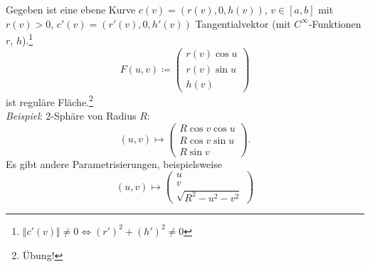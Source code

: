 \begin{example}[Rotationsfläche]
  Gegeben ist eine ebene Kurve $ c(v) = \left( r(v), 0, h(v) \right) $, $ v \in [a,b] $ mit $ r(v) > 0 $, $ c'(v) = \left( r'(v), 0, h'(v) \right) $ Tangentialvektor (mit $ C^\infty $-Funktionen $ r $, $ h $).\footnote{$ \Vert c'(v) \Vert \neq 0 \Leftrightarrow (r')^2 + (h')^2 \neq 0 $}
  \begin{equation*}
    F(u,v) \coloneqq \begin{pmatrix}
      r(v)\cos u \\
      r(v)\sin u \\
      h(v)
    \end{pmatrix}
  \end{equation*}
  ist reguläre Fläche.\footnote{Übung!} \\
  \emph{Beispiel}: $ 2 $-Sphäre von Radius $ R $:
  \begin{equation*}
    (u,v) \mapsto \begin{pmatrix}
      R\cos v \cos u \\
      R\cos v\sin u \\
      R\sin v
    \end{pmatrix}\text{.}
  \end{equation*}
  Es gibt andere Parametrisierungen, beispielsweise
  \begin{equation*}
    (u,v) \mapsto \begin{pmatrix}
      u \\ v \\ \sqrt{R^2-u^2-v^2}
    \end{pmatrix}
  \end{equation*}
\end{example}

